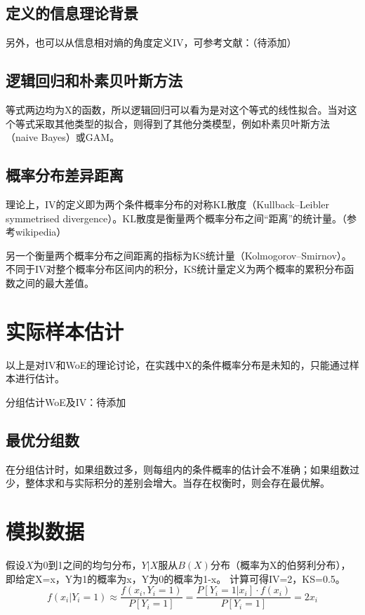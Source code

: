 \documentclass[a4paper,UTF8]{ctexart}
\begin{document}
\subsection{定义的信息理论背景}

另外，也可以从信息相对熵的角度定义IV，可参考文献：（待添加）

\subsection{逻辑回归和朴素贝叶斯方法}

等式两边均为X的函数，所以逻辑回归可以看为是对这个等式的线性拟合。当对这个等式采取其他类型的拟合，则得到了其他分类模型，例如朴素贝叶斯方法（naive Bayes）或GAM。 
\subsection{概率分布差异距离}
理论上，IV的定义即为两个条件概率分布的对称KL散度（Kullback–Leibler symmetrised divergence）。KL散度是衡量两个概率分布之间“距离”的统计量。（参考wikipedia）

另一个衡量两个概率分布之间距离的指标为KS统计量（Kolmogorov–Smirnov）。不同于IV对整个概率分布区间内的积分，KS统计量定义为两个概率的累积分布函数之间的最大差值。


\section{实际样本估计}

以上是对IV和WoE的理论讨论，在实践中X的条件概率分布是未知的，只能通过样本进行估计。

分组估计WoE及IV：待添加

\subsection{最优分组数}

在分组估计时，如果组数过多，则每组内的条件概率的估计会不准确；如果组数过少，整体求和与实际积分的差别会增大。当存在权衡时，则会存在最优解。



\section{模拟数据}

假设$X$为0到1之间的均匀分布，$Y|X$服从$B(X)$分布（概率为X的伯努利分布），即给定X=x，Y为1的概率为x，Y为0的概率为1-x。 计算可得IV=2，KS=0.5。 
\begin{equation}
  f(x_i|Y_i=1) \approx \frac{f(x_i, Y_i = 1)}{P[Y_i = 1]} =
  \frac{P[Y_i=1|x_i]\cdot f(x_i)}{P[Y_i=1]} = 2x_i
\end{equation}
\end{document}
